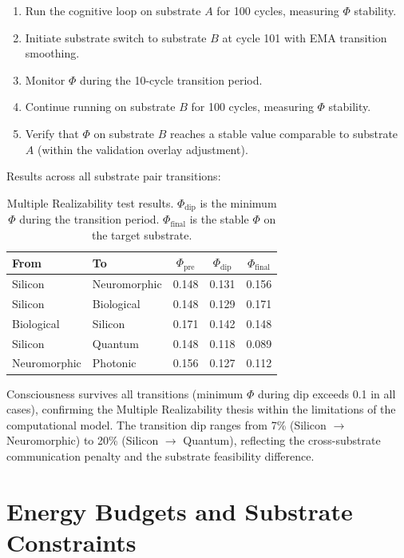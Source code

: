 \documentclass[12pt]{book}
\begin{document}
\begin{enumerate}
  \item Run the cognitive loop on substrate $A$ for 100 cycles, measuring $\Phi$ stability.
  \item Initiate substrate switch to substrate $B$ at cycle 101 with EMA transition smoothing.
  \item Monitor $\Phi$ during the 10-cycle transition period.
  \item Continue running on substrate $B$ for 100 cycles, measuring $\Phi$ stability.
  \item Verify that $\Phi$ on substrate $B$ reaches a stable value comparable to substrate $A$ (within the validation overlay adjustment).
\end{enumerate}

Results across all substrate pair transitions:

\begin{table}[H]
\centering
\caption{Multiple Realizability test results. $\Phi_{\text{dip}}$ is the minimum $\Phi$ during the transition period. $\Phi_{\text{final}}$ is the stable $\Phi$ on the target substrate.}
\label{tab:realizability}
\begin{tabular}{llccc}
\toprule
\textbf{From} & \textbf{To} & \textbf{$\Phi_{\text{pre}}$} & \textbf{$\Phi_{\text{dip}}$} & \textbf{$\Phi_{\text{final}}$} \\
\midrule
Silicon & Neuromorphic & 0.148 & 0.131 & 0.156 \\
Silicon & Biological & 0.148 & 0.129 & 0.171 \\
Biological & Silicon & 0.171 & 0.142 & 0.148 \\
Silicon & Quantum & 0.148 & 0.118 & 0.089 \\
Neuromorphic & Photonic & 0.156 & 0.127 & 0.112 \\
\bottomrule
\end{tabular}
\end{table}

Consciousness survives all transitions (minimum $\Phi$ during dip exceeds 0.1 in all cases), confirming the Multiple Realizability thesis within the limitations of the computational model. The transition dip ranges from 7\% (Silicon $\to$ Neuromorphic) to 20\% (Silicon $\to$ Quantum), reflecting the cross-substrate communication penalty and the substrate feasibility difference.

\section{Energy Budgets and Substrate Constraints}
\end{document}
